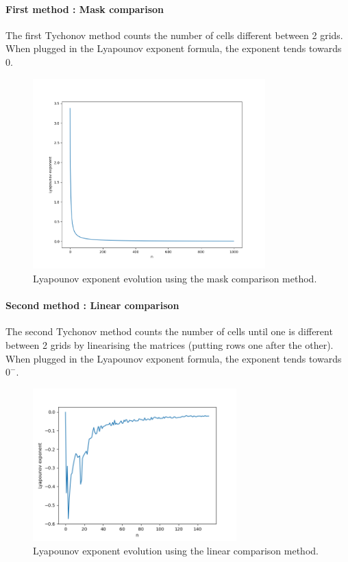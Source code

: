 \documentclass{article}
\begin{document}
\paragraph{First method : Mask comparison}
The first Tychonov method counts the number of cells different between 2 grids. When plugged
in the Lyapounov exponent formula, the exponent tends towards 0.
\begin{figure}[htbp]
    \centering
    \includegraphics[width=0.8\textwidth]{res/lyapounov_1.png}
    \caption{Lyapounov exponent evolution using the mask comparison method.}
    \label{fig:lyapounov_1}
\end{figure}



\paragraph{Second method : Linear comparison}
The second Tychonov method counts the number of cells until one is different between 2 grids by 
linearising the matrices (putting rows one after the other). When plugged
in the Lyapounov exponent formula, the exponent tends towards $0^-$.
\begin{figure}[h!]
    \centering
    \includegraphics[width=0.7\textwidth]{res/lyapounov_2.png}
    \caption{Lyapounov exponent evolution using the linear comparison method.}
    \label{fig:lyapounov_2}
\end{figure}
\end{document}
